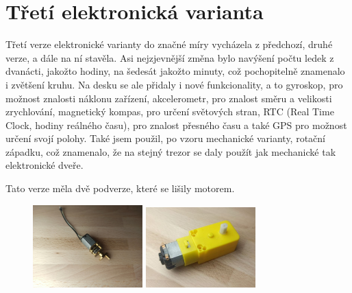 \section*{Třetí elektronická varianta}

Třetí verze elektronické varianty do značné míry vycházela z předchozí, druhé verze, a dále na ní stavěla. Asi nejzjevnější změna bylo navýšení počtu 
ledek z dvanácti, jakožto hodiny, na šedesát jakožto minuty, což pochopitelně znamenalo i zvětšení kruhu. Na desku se ale přidaly i nové funkcionality,
a to gyroskop, pro možnost znalosti náklonu zařízení, akcelerometr, pro znalost směru a velikosti zrychlování, magnetický kompas, pro určení světových
stran, RTC (Real Time Clock, hodiny reálného času), pro znalost přesného času a také GPS pro možnost určení svojí polohy.
Také jsem použil, po vzoru mechanické varianty, rotační západku, což znamenalo, že na stejný trezor se daly použít jak mechanické tak 
elektronické dveře.

Tato verze měla dvě podverze, které se lišily motorem.
\begin{figure}[htbp]
    \centering
    \includegraphics[width=160]{kapitoly/obrazky/E3/motory/hodinovyStrojek.jpg}
    \includegraphics[width=160]{kapitoly/obrazky/E3/motory/zluty_motor.jpg}
    \label{fig:M1}
\end{figure}

